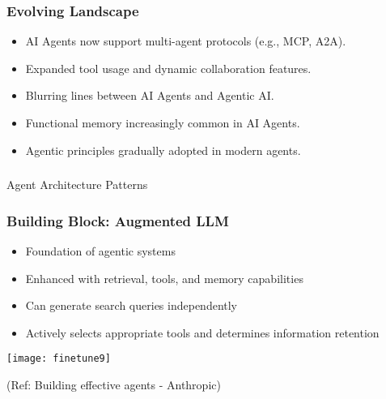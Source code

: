 \begin{frame}[fragile]\frametitle{Evolving Landscape}
    \begin{itemize}
        \item AI Agents now support multi-agent protocols (e.g., MCP, A2A).
        \item Expanded tool usage and dynamic collaboration features.
        \item Blurring lines between AI Agents and Agentic AI.
        \item Functional memory increasingly common in AI Agents.
        \item Agentic principles gradually adopted in modern agents.
    \end{itemize}
\end{frame}



\begin{frame}[fragile]\frametitle{}
\begin{center}
{\Large Agent Architecture Patterns}
\end{center}
\end{frame}

\begin{frame}[fragile]\frametitle{Building Block: Augmented LLM}
\begin{itemize}
    \item Foundation of agentic systems
    \item Enhanced with retrieval, tools, and memory capabilities
    \item Can generate search queries independently
    \item Actively selects appropriate tools and determines information retention
\end{itemize}

\begin{center}
\texttt{[image: finetune9]}
\end{center}

{\tiny (Ref: Building effective agents - Anthropic)}
\end{frame}

